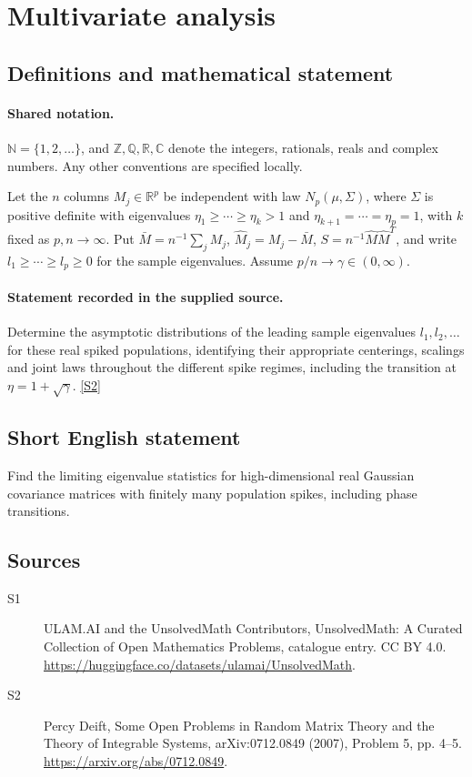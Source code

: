 \documentclass[11pt]{article}
\newcommand{\sref}[2]{\hyperlink{source:#1:#2}{[S#2]}}
\begin{document}
\section{Multivariate analysis}\label{statement}

\subsection{Definitions and mathematical statement}

\paragraph{Shared notation.}$\mathbb N=\{1,2,\ldots\}$, and $\mathbb Z,\mathbb Q,\mathbb R,\mathbb C$ denote the integers, rationals, reals and complex numbers. Any other conventions are specified locally.


Let the $n$ columns $M_j\in\mathbb R^p$ be independent with law $N_p(\mu,\Sigma)$, where $\Sigma$ is positive definite with eigenvalues $\eta_1\ge\cdots\ge\eta_k>1$ and $\eta_{k+1}=\cdots=\eta_p=1$, with $k$ fixed as $p,n\to\infty$. Put $\bar M=n^{-1}\sum_j M_j$, $\widehat M_j=M_j-\bar M$, $S=n^{-1}\widehat M\widehat M^T$, and write $l_1\ge\cdots\ge l_p\ge0$ for the sample eigenvalues. Assume $p/n\to\gamma\in(0,\infty)$.
\paragraph{Statement recorded in the supplied source.}
Determine the asymptotic distributions of the leading sample eigenvalues $l_1,l_2,\ldots$ for these real spiked populations, identifying their appropriate centerings, scalings and joint laws throughout the different spike regimes, including the transition at $\eta=1+\sqrt\gamma$. \sref{statement}{2}
\subsection{Short English statement}
Find the limiting eigenvalue statistics for high-dimensional real Gaussian covariance matrices with finitely many population spikes, including phase transitions.
\subsection{Sources}
\begin{description}
\item[\hypertarget{source:statement:1}{S1}] ULAM.AI and the UnsolvedMath Contributors, UnsolvedMath: A Curated Collection of Open Mathematics Problems, catalogue entry. CC BY 4.0. \url{https://huggingface.co/datasets/ulamai/UnsolvedMath}.
\item[\hypertarget{source:statement:2}{S2}] Percy Deift, Some Open Problems in Random Matrix Theory and the Theory of Integrable Systems, arXiv:0712.0849 (2007), Problem 5, pp. 4--5. \url{https://arxiv.org/abs/0712.0849}.
\end{description}
\label{end:statement}
\end{document}
